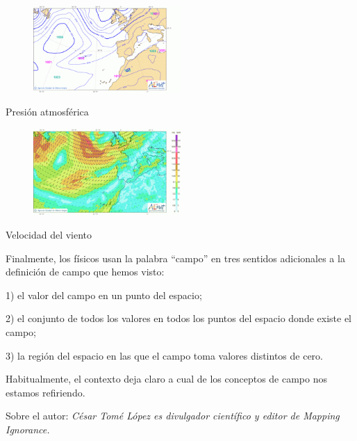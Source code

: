 	
	\begin{multicols}{2}
	\begin{figure}[H]
	\centering
	\includegraphics[width=0.5\textwidth]{imagenes/imagenes10/ExperientiaDocet03.png}
	\end{figure}
	Presión atmosférica
	\begin{figure}[H]
	\centering
	\includegraphics[width=0.5\textwidth]{imagenes/imagenes10/ExperientiaDocet04.png}
	\end{figure}
	Velocidad del viento	
	\end{multicols}





Finalmente, los físicos usan la palabra “campo” en tres sentidos adicionales a la definición de campo que hemos visto:

1) el valor del campo en un punto del espacio;

2) el conjunto de todos los valores en todos los puntos del espacio donde existe el campo;

3) la región del espacio en las que el campo toma valores distintos de cero.

Habitualmente, el contexto deja claro a cual de los conceptos de campo nos estamos refiriendo.

\vspace{4mm} \textcolor{gris}{Sobre el autor: \emph {César Tomé López es divulgador científico y editor de Mapping Ignorance.}}










	
